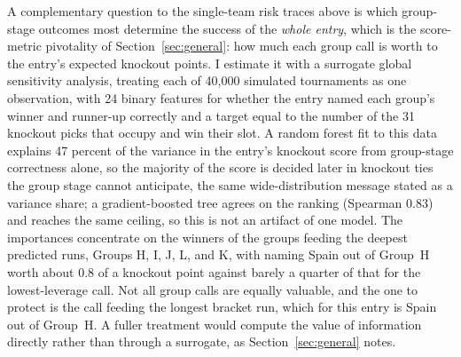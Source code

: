 \documentclass[11pt,letterpaper]{article}
\begin{document}
A complementary question to the single-team risk traces above is which group-stage outcomes most determine the success of the \emph{whole entry}, which is the score-metric pivotality of Section~\ref{sec:general}: how much each group call is worth to the entry's expected knockout points. I estimate it with a surrogate global sensitivity analysis, treating each of 40{,}000 simulated tournaments as one observation, with 24 binary features for whether the entry named each group's winner and runner-up correctly and a target equal to the number of the 31 knockout picks that occupy and win their slot. A random forest fit to this data explains 47 percent of the variance in the entry's knockout score from group-stage correctness alone, so the majority of the score is decided later in knockout ties the group stage cannot anticipate, the same wide-distribution message stated as a variance share; a gradient-boosted tree agrees on the ranking (Spearman 0.83) and reaches the same ceiling, so this is not an artifact of one model. The importances concentrate on the winners of the groups feeding the deepest predicted runs, Groups H, I, J, L, and K, with naming Spain out of Group~H worth about 0.8 of a knockout point against barely a quarter of that for the lowest-leverage call. Not all group calls are equally valuable, and the one to protect is the call feeding the longest bracket run, which for this entry is Spain out of Group~H. A fuller treatment would compute the value of information directly rather than through a surrogate, as Section~\ref{sec:general} notes.
\end{document}
